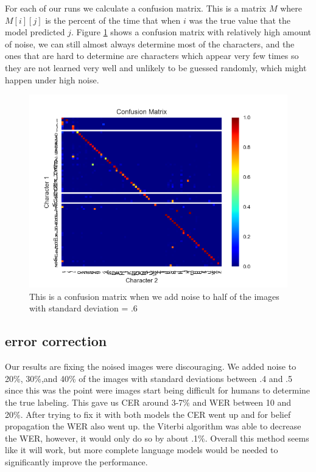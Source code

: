 \documentclass[10pt,twocolumn,letterpaper]{article}
\begin{document}
For each of our runs we calculate a confusion matrix.  This is a matrix $M$ where $M[i][j]$ is the percent of the time that when $i$ was the true value that the model predicted $j$.  Figure \ref{fig:confusion} shows a confusion matrix with relatively high amount of noise, we can still almost always determine most of the characters, and the ones that are hard to determine are characters which appear very few times so they are not learned very well and unlikely to be guessed randomly, which might happen under high noise. 

\begin{figure}
\includegraphics[scale=.5]{confusion.png}
\caption{\label{fig:confusion}This is a confusion matrix when we add noise to half of the images with standard deviation = .6}
\end{figure}


\subsection{error correction}
Our results are fixing the noised images were discouraging.  We added noise to 20\%, 30\%,and 40\% of the images with standard deviations between .4 and .5 since this was the point were images start being difficult for humans to determine the true labeling.  This gave us CER around 3-7\% and WER between 10 and 20\%.  After trying to fix it with both models the CER went up and for belief propagation the WER also went up.  the Viterbi algorithm was able to decrease the WER, however, it would only do so by about .1\%.  Overall this method seems like it will work, but more complete language models would be needed to significantly improve the performance.
\end{document}
